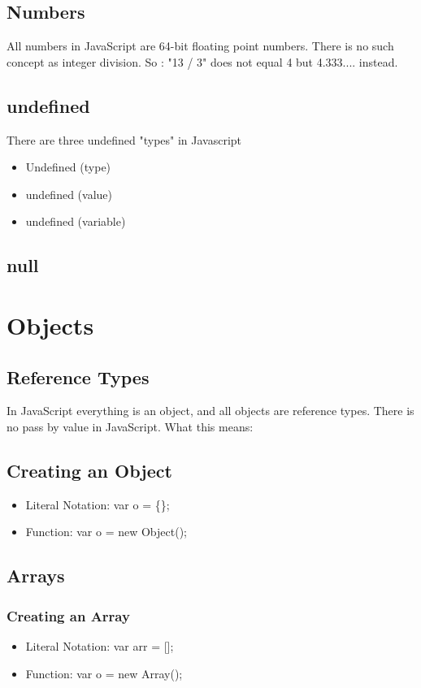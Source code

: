 \documentclass {amsart}
\begin{document}
\subsection{Numbers}
	All numbers in JavaScript are 64-bit floating point numbers.  There is no such concept as integer division.  So :  "13 / 3" does not equal 4 but 4.333.... instead.

\subsection {undefined}
	There are three undefined "types" in Javascript 
	\begin{itemize}
		\item Undefined (type)
		\item undefined (value)
		\item undefined (variable)
	\end{itemize}


\subsection {null}


\section{Objects}
	\subsection {Reference Types}
		In JavaScript everything is an object, and all objects are reference types.  There is no pass by value in JavaScript.  
		What this means: 
	
	\subsection{Creating an Object}
		\begin{itemize}
			\item Literal Notation: var o = \{\};
			\item Function: var o = new Object();
		\end{itemize}		

	\subsection{Arrays}
		\subsubsection {Creating an Array}
			\begin{itemize}
				\item Literal Notation: var arr = [];
				\item Function: var o = new Array();
			\end{itemize}
	
\end{document}

